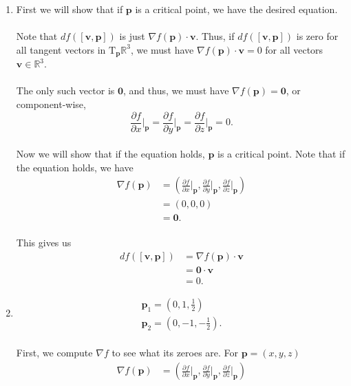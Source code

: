 \documentclass[12 pt, letterpaper]{hmcpset}
\begin{document}
\begin{solution}
	\begin{enumerate}
		\item 
			First we will show that if $\mathbf p$ is a critical point, we have the desired equation. \\\\
			Note that $df([\mathbf v, \mathbf p])$ is just $\nabla f(\mathbf p) \cdot \mathbf v$. Thus, if $df([\mathbf v, \mathbf p])$ is zero for all tangent vectors in $\mathrm T_{\mathbf p} \mathbb R^3$, we must have $\nabla f(\mathbf p) \cdot \mathbf v = 0$ for all vectors $\mathbf v \in \mathbb R^3$. \\\\
			The only such vector is $\mathbf 0$, and thus, we must have $\nabla f(\mathbf p) = \mathbf 0$, or component-wise,
			\[
				\frac{\partial f}{\partial x} \Big |_{\mathbf p} = \frac{\partial f}{\partial y} \Big |_{\mathbf p} = \frac{\partial f}{\partial z} \Big |_{\mathbf p} = 0.
			\] \\
			Now we will show that if the equation holds, $\mathbf p$ is a critical point. Note that if the equation holds, we have
			\[
				\begin{split}
					\nabla f(\mathbf p) & = \left ( \frac{\partial f}{\partial x} \Big |_{\mathbf p}, \frac{\partial f}{\partial y} \Big |_{\mathbf p}, \frac{\partial f}{\partial z} \Big |_{\mathbf p} \right ) \\
							    & = (0, 0, 0) \\
							    & = \mathbf 0.
				\end{split}
			\] \\
			This gives us
			\[
				\begin{split}
					df([\mathbf v, \mathbf p]) & = \nabla f(\mathbf p) \cdot \mathbf v \\
								   & = \mathbf 0 \cdot \mathbf v \\
								   & = 0.
				\end{split}
			\]
		\item
			\[
				\boxed{
					\begin{gathered}
						\mathbf p_1 = \left ( 0, 1, \frac{1}{2} \right ) \\
						\mathbf p_2 = \left ( 0, -1, -\frac{1}{2} \right ).
					\end{gathered}
				}
			\] \\
			First, we compute $\nabla f$ to see what its zeroes are. For $\mathbf p = (x, y, z)$
			\[
				\begin{split}
					\nabla f(\mathbf p) & = \left ( \frac{\partial f}{\partial x} \Big |_{\mathbf p}, \frac{\partial f}{\partial y} \Big |_{\mathbf p}, \frac{\partial f}{\partial z} \Big |_{\mathbf p} \right ) \\

\end{split}\]
\end{enumerate}
\end{solution}
\end{document}
